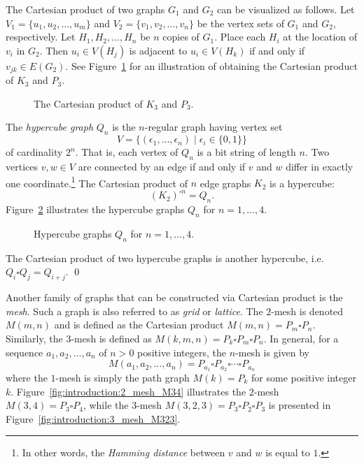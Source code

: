 The Cartesian product of two graphs $G_1$ and $G_2$ can be visualized
as follows. Let $V_1 = \{u_1, u_2, \dots, u_m\}$ and
$V_2 = \{v_1, v_2, \dots, v_n\}$ be the vertex sets of $G_1$ and
$G_2$, respectively. Let $H_1, H_2, \dots, H_n$ be $n$ copies of
$G_1$. Place each $H_i$ at the location of $v_i$ in $G_2$. Then
$u_i \in V(H_j)$ is adjacent to $u_i \in V(H_k)$ if and only if
$v_{jk} \in E(G_2)$. See
Figure~\ref{fig:introduction:Cartesian_product_K3_P3} for an
illustration of obtaining the Cartesian product of $K_3$ and $P_3$.

\begin{figure}[!htbp]
\centering
{}

\caption{The Cartesian product of $K_3$ and $P_3$.}
\label{fig:introduction:Cartesian_product_K3_P3}
\end{figure}

The \emph{hypercube graph}
$Q_n$ is the $n$-regular graph having vertex set
\[
V
=
\big\{ (\epsilon_1,\dots,\epsilon_n) \;|\; \epsilon_i \in \{0,1\} \big\}
\]
of cardinality $2^n$. That is, each vertex of $Q_n$ is a bit string of
length $n$. Two vertices $v,w \in V$ are connected by an edge if and
only if $v$ and $w$ differ in exactly one coordinate.\footnote{
  In other words, the \emph{Hamming distance}
  between $v$ and $w$ is equal to $1$.
}
The Cartesian product of $n$ edge graphs $K_2$ is a hypercube:
\[
(K_2)^{\square n} = Q_n.
\]
Figure~\ref{fig:introduction:hypercube_graphs} illustrates the
hypercube graphs $Q_n$ for $n = 1,\dots,4$.

\begin{figure}[!htbp]
\centering
{}

\caption{Hypercube graphs $Q_n$ for $n = 1,\dots,4$.}
\label{fig:introduction:hypercube_graphs}
\end{figure}

\begin{example}
\rm
The Cartesian product of two hypercube graphs is another
hypercube, i.e. $Q_i \square Q_j = Q_{i+j}$. \qed
\end{example}

Another family of graphs that can be constructed via Cartesian product
is the \emph{mesh}. Such a graph is also referred to as
\emph{grid} or \emph{lattice}. The $2$-mesh
is denoted $M(m,n)$ and is defined as the Cartesian product
$M(m,n) = P_m \square P_n$. Similarly, the $3$-mesh is defined as
$M(k,m,n) = P_k \square P_m \square P_n$. In general, for a sequence
$a_1, a_2, \dots, a_n$ of $n > 0$ positive integers, the $n$-mesh is
given by
\[
M(a_1, a_2, \dots, a_n)
=
P_{a_1} \square P_{a_2} \square \cdots \square P_{a_n}
\]
where the $1$-mesh is simply the path graph $M(k) = P_k$ for some
positive integer $k$. Figure~\ref{fig:introduction:2_mesh_M34}
illustrates the $2$-mesh $M(3,4) = P_3 \square P_4$, while the
$3$-mesh $M(3,2,3) = P_3 \square P_2 \square P_3$ is presented in
Figure~\ref{fig:introduction:3_mesh_M323}.

